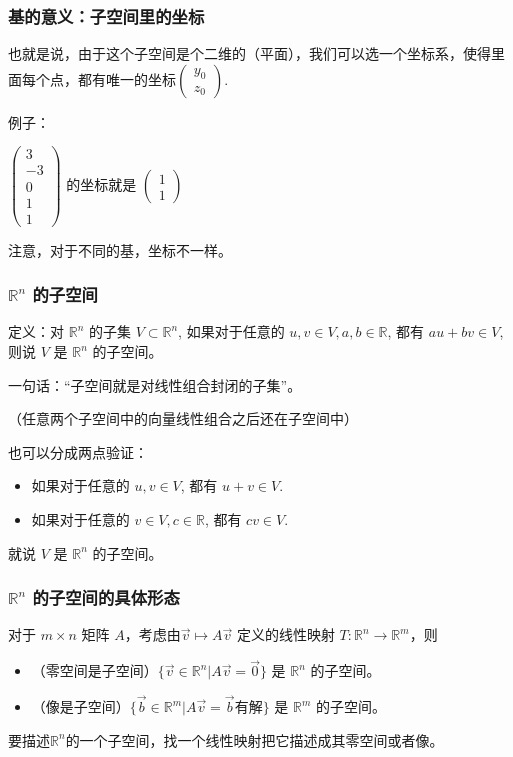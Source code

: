\documentclass[CJK]{beamer}
\begin{document}
\begin{frame}
\frametitle{基的意义：子空间里的坐标}
也就是说，由于这个子空间是个二维的（平面），我们可以\alert{选一个坐标系}，使得里面每个点，都有唯一的坐标$\begin{pmatrix} y_0\\z_0 \end{pmatrix}$.

例子：

$\begin{pmatrix} 3 \\ -3 \\ 0 \\ 1 \\ 1\end{pmatrix}$ 的坐标就是 $\begin{pmatrix} 1\\1 \end{pmatrix}$

注意，\alert{对于不同的基，坐标不一样}。
\end{frame}

\begin{frame}
\frametitle{$\mathbb R^n$ 的子空间}

定义：对 $\mathbb R^n$ 的子集 $V \subset \mathbb R^n$, 如果对于任意的 $u, v\in V, a, b\in \mathbb R$, 都有 $au+bv\in V$, 则说 $V$ 是 $\mathbb R^n$ 的子空间。
\vspace{12px}

一句话：``子空间就是\alert{对线性组合封闭}的子集''。

（任意两个子空间中的向量线性组合之后还在子空间中）
\vspace{12px}

也可以分成两点验证：
\begin{itemize}
    \item 如果对于任意的 $u, v\in V$, 都有 $u+v\in V$.
    \item 如果对于任意的 $v\in V, c\in \mathbb R$, 都有 $cv\in V$.
\end{itemize}
就说 $V$ 是 $\mathbb R^n$ 的子空间。

\end{frame}

\begin{frame}
\frametitle{$\mathbb R^n$ 的子空间的具体形态}

对于 $m \times n$ 矩阵 $A$，考虑由$\vec{v}\mapsto A\vec{v}$ 定义的线性映射 $T:\mathbb R ^n\to \mathbb R ^m$，则
\begin{itemize}
    \item （零空间是子空间）$\{\vec{v}\in\mathbb{R}^n|A\vec{v} = \vec{0}\}$ 是 $\mathbb R ^n$ 的子空间。
    \item （像是子空间）$\{\vec{b}\in\mathbb{R}^m|A\vec{v} = \vec{b}\text{有解}\}$ 是 $\mathbb R ^m$ 的子空间。
\end{itemize}

要描述$\mathbb R^n$的一个子空间，找一个线性映射把它描述成其零空间或者像。
\end{frame}
\end{document}
